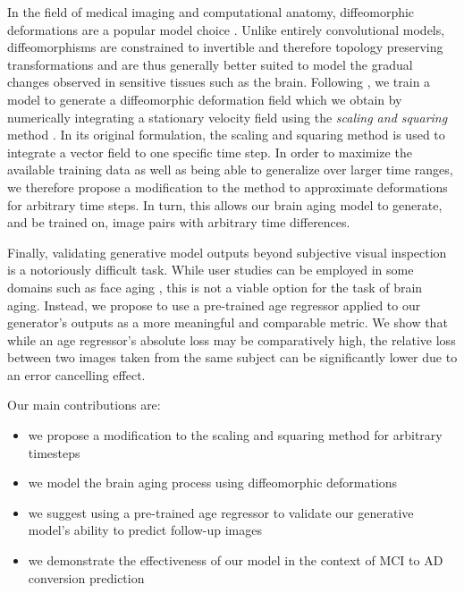 In the field of medical imaging and computational anatomy, diffeomorphic deformations are a popular model choice \cite{beg2005computing} \cite{ashburner2007fast}. Unlike entirely convolutional models, diffeomorphisms are constrained to invertible and therefore topology preserving transformations and are thus generally better suited to model the gradual changes observed in sensitive tissues such as the brain. Following \cite{dalca2018unsupervised}, we train a model to generate a diffeomorphic deformation field which we obtain by numerically integrating a stationary velocity field using the \textit{scaling and squaring} method \cite{arsigny2006log}. In its original formulation, the scaling and squaring method is used to integrate a vector field to one specific time step. In order to maximize the available training data as well as being able to generalize over larger time ranges, we therefore propose a modification to the method to approximate deformations for arbitrary time steps. In turn, this allows our brain aging model to generate, and be trained on, image pairs with arbitrary time differences. 

Finally, validating generative model outputs beyond subjective visual inspection is a notoriously difficult task. While user studies can be employed in some domains such as face aging \cite{palsson2018generative}, this is not a viable option for the task of brain aging. Instead, we propose to use a pre-trained age regressor applied to our generator's outputs as a more meaningful and comparable metric. We show that while an age regressor's absolute loss may be comparatively high, the relative loss between two images taken from the same subject can be significantly lower due to an error cancelling effect.

Our main contributions are:

\begin{itemize}
	\item we propose a modification to the scaling and squaring method for arbitrary timesteps
	\item we model the brain aging process using diffeomorphic deformations%
	\item we suggest using a pre-trained age regressor to validate our generative model's ability to predict follow-up images
	\item we demonstrate the effectiveness of our model in the context of MCI to AD conversion prediction
\end{itemize}

